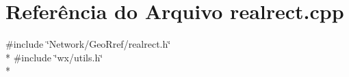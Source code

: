 \section{Referência do Arquivo realrect.\+cpp}
\label{realrect_8cpp}
{\ttfamily \#include \char`\"{}Network/\+Geo\+Rref/realrect.\+h\char`\"{}}\\*
{\ttfamily \#include \char`\"{}wx/utils.\+h\char`\"{}}\\*
